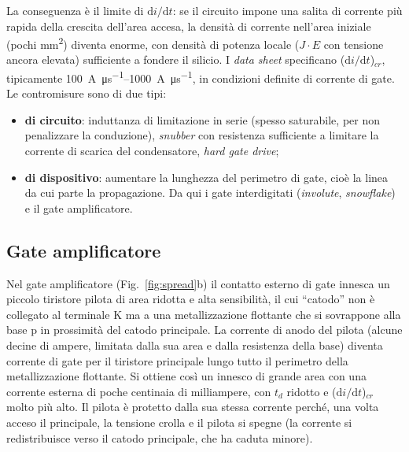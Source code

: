 \documentclass[11pt,a4paper]{article}
\newcommand{\didt}{\ensuremath{\mathrm{d}i/\mathrm{d}t}}
\newcommand{\en}[1]{\emph{#1}}   %
\begin{document}
La conseguenza è il limite di $\didt$: se il circuito impone una salita di corrente più rapida della crescita dell'area accesa, la densità di corrente nell'area iniziale (pochi \unit{\mm\squared}) diventa enorme, con densità di potenza locale ($J\cdot E$ con tensione ancora elevata) sufficiente a fondere il silicio. I \en{data sheet} specificano ($\didt$)$_{cr}$, tipicamente \qtyrange{100}{1000}{\A\per\us}, in condizioni definite di corrente di gate. Le contromisure sono di due tipi:
\begin{itemize}
  \item \textbf{di circuito}: induttanza di limitazione in serie (spesso saturabile, per non penalizzare la conduzione), \en{snubber} con resistenza sufficiente a limitare la corrente di scarica del condensatore, \en{hard gate drive};
  \item \textbf{di dispositivo}: aumentare la lunghezza del perimetro di gate, cioè la linea da cui parte la propagazione. Da qui i gate interdigitati (\en{involute}, \en{snowflake}) e il gate amplificatore.
\end{itemize}

\subsection{Gate amplificatore}
Nel gate amplificatore (Fig.~\ref{fig:spread}b) il contatto esterno di gate innesca un piccolo tiristore pilota di area ridotta e alta sensibilità, il cui ``catodo'' non è collegato al terminale K ma a una metallizzazione flottante che si sovrappone alla base p in prossimità del catodo principale. La corrente di anodo del pilota (alcune decine di ampere, limitata dalla sua area e dalla resistenza della base) diventa corrente di gate per il tiristore principale lungo tutto il perimetro della metallizzazione flottante. Si ottiene così un innesco di grande area con una corrente esterna di poche centinaia di milliampere, con $t_d$ ridotto e ($\didt$)$_{cr}$ molto più alto. Il pilota è protetto dalla sua stessa corrente perché, una volta acceso il principale, la tensione crolla e il pilota si spegne (la corrente si redistribuisce verso il catodo principale, che ha caduta minore).
\end{document}
